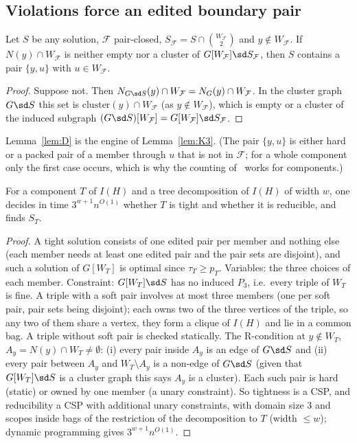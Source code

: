 \subsection{Violations force an edited boundary pair}
\begin{lemma}[D]\label{lem:D}
Let $S$ be any solution, $\mathcal F$ pair-closed, $S_{\mathcal F}=S\cap\binom{W_{\mathcal F}}2$ and $y\notin W_{\mathcal F}$. If $N(y)\cap W_{\mathcal F}$ is neither empty nor a cluster of $G[W_{\mathcal F}]\sd S_{\mathcal F}$, then $S$ contains a pair $\{y,u\}$ with $u\in W_{\mathcal F}$.
\end{lemma}
\begin{proof}
Suppose not. Then $N_{G\sd S}(y)\cap W_{\mathcal F}=N_G(y)\cap W_{\mathcal F}$. In the cluster graph $G\sd S$ this set is $\mathrm{cluster}(y)\cap W_{\mathcal F}$ (as $y\notin W_{\mathcal F}$), which is empty or a cluster of the induced subgraph $(G\sd S)[W_{\mathcal F}]=G[W_{\mathcal F}]\sd S_{\mathcal F}$.
\end{proof}
Lemma~\ref{lem:D} is the engine of Lemma~\ref{lem:K3}. (The pair $\{y,u\}$ is either hard or a packed pair of a member through $u$ that is not in $\mathcal F$; for a whole component only the first case occurs, which is why the counting of~\cite{BFK18} works for components.)

\begin{proposition}\label{prop:two}
For a component $T$ of $I(H)$ and a tree decomposition of $I(H)$ of width $w$, one decides in time $3^{w+1}n^{O(1)}$ whether $T$ is tight and whether it is reducible, and finds $S_T$.
\end{proposition}
\begin{proof}
A tight solution consists of one edited pair per member and nothing else (each member needs at least one edited pair and the pair sets are disjoint), and such a solution of $G[W_T]$ is optimal since $\tau_T\ge p_T$. Variables: the three choices of each member. Constraint: $G[W_T]\sd S$ has no induced $P_3$, i.e.\ every triple of $W_T$ is fine. A triple with a soft pair involves at most three members (one per soft pair, pair sets being disjoint); each owns two of the three vertices of the triple, so any two of them share a vertex, they form a clique of $I(H)$ and lie in a common bag. A triple without soft pair is checked statically. The R-condition at $y\notin W_T$, $A_y=N(y)\cap W_T\ne\emptyset$: (i) every pair inside $A_y$ is an edge of $G\sd S$ and (ii) every pair between $A_y$ and $W_T\setminus A_y$ is a non-edge of $G\sd S$ (given that $G[W_T]\sd S$ is a cluster graph this says $A_y$ is a cluster). Each such pair is hard (static) or owned by one member (a unary constraint). So tightness is a CSP, and reducibility a CSP with additional unary constraints, with domain size $3$ and scopes inside bags of the restriction of the decomposition to $T$ (width $\le w$); dynamic programming gives $3^{w+1}n^{O(1)}$.
\end{proof}

